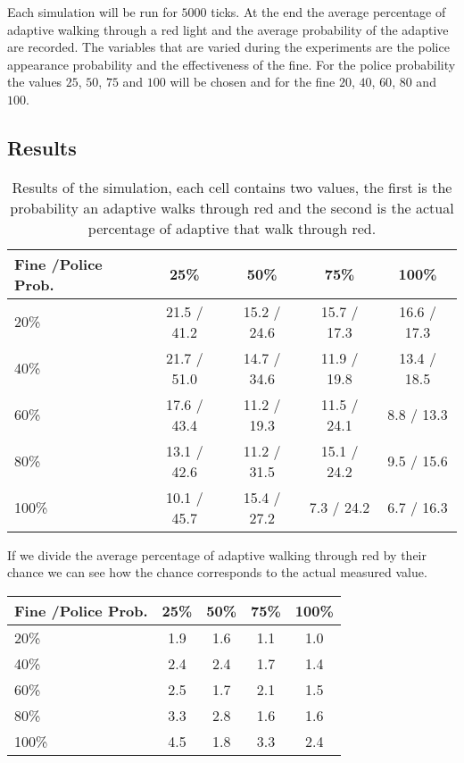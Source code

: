 \documentclass[a4paper]{article}
\begin{document}
Each simulation will be run for $5000$ ticks. At the end the average percentage of adaptive walking through a red light and the average probability of the adaptive are recorded. The variables that are varied during the experiments are the police appearance probability and the effectiveness of the fine. For the police probability the values $25$, $50$, $75$ and $100$ will be chosen and for the fine $20$, $40$, $60$, $80$ and $100$.

\subsection{Results}
\begin{table}[H]
\centering
\begin{tabular}{ l | c c c c }
  Fine \slash Police Prob. & 25\% & 50\% & 75\% & 100\% \\ 
  \hline
  20\%  & 21.5 / 41.2 & 15.2 / 24.6 & 15.7 / 17.3 & 16.6 / 17.3  \\
  40\%  & 21.7 / 51.0 & 14.7 / 34.6 & 11.9 / 19.8 & 13.4 / 18.5  \\
  60\%  & 17.6 / 43.4 & 11.2 / 19.3 & 11.5 / 24.1 &  8.8 / 13.3  \\
  80\%  & 13.1 / 42.6 & 11.2 / 31.5 & 15.1 / 24.2 &  9.5 / 15.6  \\
  100\% & 10.1 / 45.7 & 15.4 / 27.2 &  7.3 / 24.2 &  6.7 / 16.3  \\
\end{tabular}
\caption{Results of the simulation, each cell contains two values, the first is the probability an adaptive walks through red and the second is the actual percentage of adaptive that walk through red.}
\end{table}
If we divide the average percentage of adaptive walking through red by their chance we can see how the chance corresponds to the actual measured value.

\begin{table}[H]
\centering
\begin{tabular}{ l | c c c c }
  Fine \slash Police Prob. & 25\% & 50\% & 75\% & 100\% \\ 
  \hline
  20\%  & 1.9 & 1.6 & 1.1 & 1.0  \\
  40\%  & 2.4 & 2.4 & 1.7 & 1.4  \\
  60\%  & 2.5 & 1.7 & 2.1 & 1.5  \\
  80\%  & 3.3 & 2.8 & 1.6 & 1.6  \\
  100\% & 4.5 & 1.8 & 3.3 & 2.4  \\
\end{tabular}
\end{table}
\end{document}
